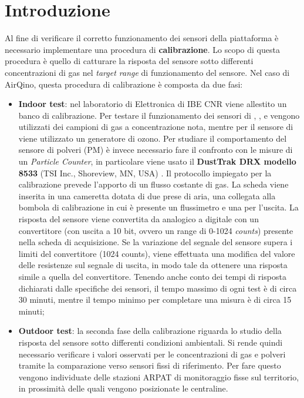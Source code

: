\section{Introduzione}\label{sec:calib-intro}
Al fine di verificare il corretto funzionamento dei sensori della piattaforma è necessario implementare una procedura di \textbf{calibrazione}. Lo scopo di questa procedura è quello di catturare la risposta del sensore sotto differenti concentrazioni di gas nel \textit{target range} di funzionamento del sensore. Nel caso di AirQino, questa procedura di calibrazione è composta da due fasi:
\begin{itemize}
  \item \textbf{Indoor test}: nel laboratorio di Elettronica di IBE CNR viene allestito un banco di calibrazione. Per testare il funzionamento dei sensori di , ,  e  vengono utilizzati dei campioni di gas a concentrazione nota, mentre per il sensore di  viene utilizzato un generatore di ozono. Per studiare il comportamento del sensore di polveri (PM) è invece necessario fare il confronto con le misure di un \textit{Particle Counter}, in particolare viene usato il \textbf{DustTrak DRX modello 8533} (TSI Inc., Shoreview, MN, USA) \cite{dust}. Il protocollo impiegato per la calibrazione prevede l’apporto di un flusso costante di gas. La scheda viene inserita in una cameretta dotata di due prese di aria, una collegata alla bombola di calibrazione in cui è presente un flussimetro e una per l’uscita. La risposta del sensore viene convertita da analogico a digitale con un convertitore (con uscita a 10 bit, ovvero un range di 0-1024 \textit{counts}) presente nella scheda di acquisizione. Se la variazione del segnale del sensore supera i limiti del convertitore (1024 counts), viene effettuata una modifica del valore delle resistenze sul segnale di uscita, in modo tale da ottenere una risposta simile a quella del convertitore. Tenendo anche conto dei tempi di risposta dichiarati dalle specifiche dei sensori, il tempo massimo di ogni test è di circa 30 minuti, mentre il tempo minimo per completare una misura è di circa 15 minuti; \cite{relazione_alice}
  \item \textbf{Outdoor test}: la seconda fase della calibrazione riguarda lo studio della risposta del sensore sotto differenti condizioni ambientali. Si rende quindi necessario verificare i valori osservati per le concentrazioni di gas e polveri tramite la comparazione verso sensori fissi di riferimento. Per fare questo vengono individuate delle stazioni ARPAT di monitoraggio fisse sul territorio, in prossimità delle quali vengono posizionate le centraline. \cite{relazione_alice}
\end{itemize}

